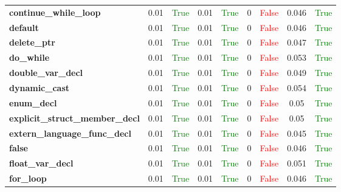 \documentclass{article}
\begin{document}
\begin{xltabular}{\textwidth}{lcccccccc}
\textbf{{\fontsize{10}{12}\selectfont continue\_while\_loop}}& 0.01&\textcolor{green}{True}& 0.01&\textcolor{green}{True}& 0&\textcolor{red}{False}& 0.046&\textcolor{green}{True} \\[0.5ex]
\textbf{{\fontsize{10}{12}\selectfont default}}& 0.01&\textcolor{green}{True}& 0.01&\textcolor{green}{True}& 0&\textcolor{red}{False}& 0.046&\textcolor{green}{True} \\[0.5ex]
\textbf{{\fontsize{10}{12}\selectfont delete\_ptr}}& 0.01&\textcolor{green}{True}& 0.01&\textcolor{green}{True}& 0&\textcolor{red}{False}& 0.047&\textcolor{green}{True} \\[0.5ex]
\textbf{{\fontsize{10}{12}\selectfont do\_while}}& 0.01&\textcolor{green}{True}& 0.01&\textcolor{green}{True}& 0&\textcolor{red}{False}& 0.053&\textcolor{green}{True} \\[0.5ex]
\textbf{{\fontsize{10}{12}\selectfont double\_var\_decl}}& 0.01&\textcolor{green}{True}& 0.01&\textcolor{green}{True}& 0&\textcolor{red}{False}& 0.049&\textcolor{green}{True} \\[0.5ex]
\textbf{{\fontsize{10}{12}\selectfont dynamic\_cast}}& 0.01&\textcolor{green}{True}& 0.01&\textcolor{green}{True}& 0&\textcolor{red}{False}& 0.054&\textcolor{green}{True} \\[0.5ex]
\textbf{{\fontsize{10}{12}\selectfont enum\_decl}}& 0.01&\textcolor{green}{True}& 0.01&\textcolor{green}{True}& 0&\textcolor{red}{False}& 0.05&\textcolor{green}{True} \\[0.5ex]
\textbf{{\fontsize{10}{12}\selectfont explicit\_struct\_member\_decl}}& 0.01&\textcolor{green}{True}& 0.01&\textcolor{green}{True}& 0&\textcolor{red}{False}& 0.05&\textcolor{green}{True} \\[0.5ex]
\textbf{{\fontsize{10}{12}\selectfont extern\_language\_func\_decl}}& 0.01&\textcolor{green}{True}& 0.01&\textcolor{green}{True}& 0&\textcolor{red}{False}& 0.045&\textcolor{green}{True} \\[0.5ex]
\textbf{{\fontsize{10}{12}\selectfont false}}& 0.01&\textcolor{green}{True}& 0.01&\textcolor{green}{True}& 0&\textcolor{red}{False}& 0.046&\textcolor{green}{True} \\[0.5ex]
\textbf{{\fontsize{10}{12}\selectfont float\_var\_decl}}& 0.01&\textcolor{green}{True}& 0.01&\textcolor{green}{True}& 0&\textcolor{red}{False}& 0.051&\textcolor{green}{True} \\[0.5ex]
\textbf{{\fontsize{10}{12}\selectfont for\_loop}}& 0.01&\textcolor{green}{True}& 0.01&\textcolor{green}{True}& 0&\textcolor{red}{False}& 0.046&\textcolor{green}{True} \\[0.5ex]

\end{xltabular}
\end{document}
